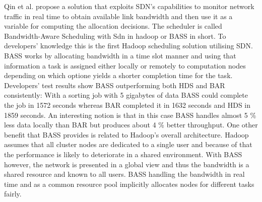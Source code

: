 \documentclass{acm_proc_article-sp}
\begin{document}
Qin et al. propose a solution that exploits SDN's capabilities to monitor network traffic in real time to obtain available link bandwidth and then use it as a variable for computing the allocation decisions. The scheduler is called Bandwidth-Aware Scheduling with Sdn in hadoop or BASS in short. To developers' knowledge this is the first Hadoop scheduling solution utilising SDN. BASS works by allocating bandwidth in a time slot manner and using that information a task is assigned either locally or remotely to computation nodes depending on which optione yields a shorter completion time for the task. Developers' test results show BASS outperforming both HDS and BAR consistently: With a sorting job with 5 gigabytes of data BASS could complete the job in 1572 seconds whereas BAR completed it in 1632 seconds and HDS in 1859 seconds. An interesting notion is that in this case BASS handles almost 5 \% less data locally than BAR but produces about 4 \% better throughput. One other benefit that BASS provides is related to Hadoop's overall architecture. Hadoop assumes that all cluster nodes are dedicated to a single user and because of that the performance is likely to deteriorate in a shared environment. With BASS however, the network is presented in a global view and thus the bandwidth is a shared resource and known to all users. BASS handling the bandwidth in real time and as a common resource pool implicitly allocates nodes for different tasks fairly.
\end{document}
